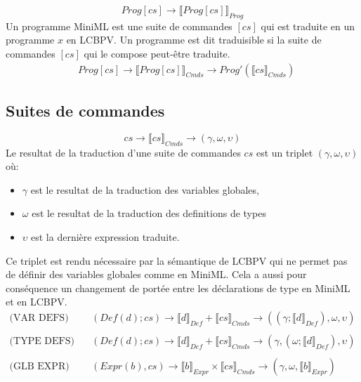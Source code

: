 \documentclass[
  12pt,
]{article}
\providecommand{\tightlist}{%
  \setlength{\itemsep}{0pt}\setlength{\parskip}{0pt}}
\begin{document}
\[ Prog[cs] \rightarrow \llbracket Prog[cs] \rrbracket_{Prog}  \] Un programme MiniML
est une suite de commandes \([cs]\) qui est traduite en un programme
\(x\) en LCBPV. Un programme est dit traduisible si la suite de
commandes \([cs]\) qui le compose peut-être traduite.
\begin{align*}
    &  Prog[cs] \rightarrow  \llbracket Prog[cs] \rrbracket_{Cmds} \rightarrow Prog'(\llbracket cs \rrbracket_{Cmds} )
\end{align*}

\hypertarget{suites-de-commandes}{%
  \subsection{Suites de commandes}\label{suites-de-commandes}}

\[ cs \rightarrow \llbracket cs \rrbracket_{Cmds} \rightarrow (\gamma,\omega,\upsilon) \] Le
resultat de la traduction d'une suite de commandes \(cs\) est un triplet
\((\gamma,\omega,\upsilon)\) où:

\begin{itemize}
  \tightlist
  \item
        \(\gamma\) est le resultat de la traduction des variables globales,
  \item
        \(\omega\) est le resultat de la traduction des definitions de types
  \item
        \(\upsilon\) est la dernière expression traduite.
\end{itemize}

Ce triplet est rendu nécessaire par la sémantique de LCBPV qui ne permet
pas de définir des variables globales comme en MiniML. Cela a aussi pour
conséquence un changement de portée entre les déclarations de type en
MiniML et en LCBPV.
\begin{align*}
  \text{(VAR DEFS)} \quad      & (Def(d); cs) \rightarrow \llbracket d \rrbracket_{Def} +  \llbracket cs \rrbracket_{Cmds} \rightarrow ((\gamma;\llbracket d \rrbracket_{Def}),\omega,\upsilon) \\
  \\
  \text{(TYPE DEFS)} \quad & (Def(d); cs) \rightarrow \llbracket d \rrbracket_{Def} + \llbracket cs \rrbracket_{Cmds} \rightarrow (\gamma,(\omega;\llbracket d \rrbracket_{Def}),\upsilon) \\
  \\
  \text{(GLB EXPR)} \quad & (Expr(b), cs) \rightarrow \llbracket b \rrbracket_{Expr} \times \llbracket cs \rrbracket_{Cmds}  \rightarrow (\gamma,\omega,\llbracket b \rrbracket_{Expr})
\end{align*}
\end{document}
